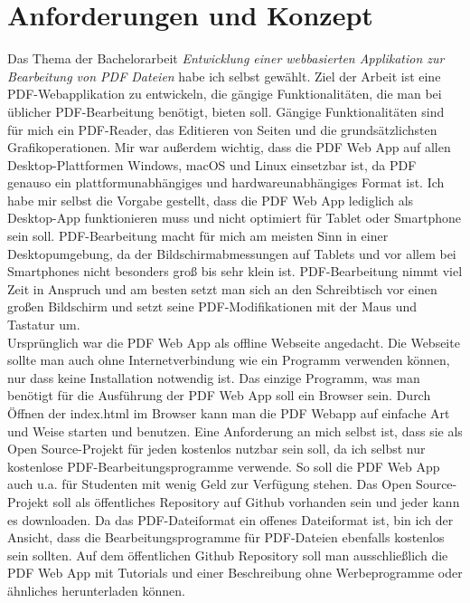 \section{Anforderungen und Konzept}
Das Thema der Bachelorarbeit \textit{\glqq Entwicklung einer webbasierten Applikation zur Bearbeitung von PDF Dateien\grqq} habe ich selbst gewählt. Ziel der Arbeit ist eine PDF-Webapplikation zu entwickeln, die gängige Funktionalitäten, die man bei üblicher PDF-Bearbeitung benötigt, bieten soll. Gängige Funktionalitäten sind für mich ein PDF-Reader, das Editieren von Seiten und die grundsätzlichsten Grafikoperationen. Mir war außerdem wichtig, dass die PDF Web App auf allen Desktop-Plattformen Windows, macOS und Linux einsetzbar ist, da PDF genauso ein plattformunabhängiges und hardwareunabhängiges Format ist. Ich habe mir selbst die Vorgabe gestellt, dass die PDF Web App lediglich als Desktop-App funktionieren muss und nicht optimiert für Tablet oder Smartphone sein soll. PDF-Bearbeitung macht für mich am meisten Sinn in einer Desktopumgebung, da der Bildschirmabmessungen auf Tablets und vor allem bei Smartphones nicht besonders groß bis sehr klein ist. PDF-Bearbeitung nimmt viel Zeit in Anspruch und am besten setzt man sich an den Schreibtisch vor einen großen Bildschirm und setzt seine PDF-Modifikationen mit der Maus und Tastatur um. \\
Ursprünglich war die PDF Web App als offline Webseite angedacht. Die Webseite sollte man auch ohne Internetverbindung wie ein Programm verwenden können, nur dass keine Installation notwendig ist. Das einzige Programm, was man benötigt für die Ausführung der PDF Web App soll ein Browser sein. Durch Öffnen der index.html im Browser kann man die PDF Webapp auf einfache Art und Weise starten und benutzen. Eine Anforderung an mich selbst ist, dass sie als Open Source-Projekt für jeden kostenlos nutzbar sein soll, da ich selbst nur kostenlose PDF-Bearbeitungsprogramme verwende. So soll die PDF Web App auch u.a. für Studenten mit wenig Geld zur Verfügung stehen. Das Open Source-Projekt soll als öffentliches Repository auf Github vorhanden sein und jeder kann es downloaden. Da das PDF-Dateiformat ein offenes Dateiformat ist, bin ich der Ansicht, dass die Bearbeitungsprogramme für PDF-Dateien ebenfalls kostenlos sein sollten. Auf dem öffentlichen Github Repository soll man ausschließlich die PDF Web App mit Tutorials und einer Beschreibung ohne Werbeprogramme oder ähnliches herunterladen können. \\
